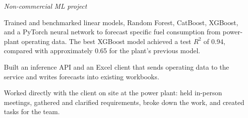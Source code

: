 \textit{Non-commercial ML project}
\begin{cvitems}
    \item Trained and benchmarked linear models, Random Forest, CatBoost, XGBoost, and a PyTorch neural network to forecast specific fuel consumption from power-plant operating data. The best XGBoost model achieved a test $R^2$ of 0.94, compared with approximately 0.65 for the plant's previous model.
    \item Built an inference API and an Excel client that sends operating data to the service and writes forecasts into existing workbooks.
    \item Worked directly with the client on site at the power plant: held in-person meetings, gathered and clarified requirements, broke down the work, and created tasks for the team.
\end{cvitems}
